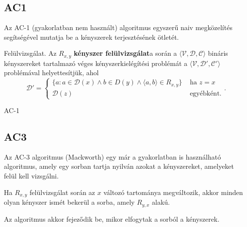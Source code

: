 \subsection{AC1}

Az AC-1 (gyakorlatban nem használt) algoritmus egyszerű naiv megközelítés
segítségével mutatja be a kényszerek terjesztésének ötletét.

\begin{definicio}
    Felülvizsgálat.
    Az $R_{x,y}$ \textbf{kényszer felülvizsgálat}a során a
    $\langle \mathcal{V}, \mathcal{D}, \mathcal{C} \rangle$
    bináris kényszereket tartalmazó véges kényszerkielégítési problémát a
    $\langle \mathcal{V}, \mathcal{D}', \mathcal{C}' \rangle$
    problémával helyettesítjük, ahol \[
    \mathcal{D}' =
    \begin{cases}
        \{a : a \in \mathcal{D}(x) \land b \in D(y) \land \langle a, b\rangle \in R_{x,y}\}
        &\text{ ha } z=x \\
        \mathcal{D}(z)
        &\text{ egyébként.}
    \end{cases}
    .\]
\end{definicio}

\begin{algorithm}[H]
    \DontPrintSemicolon
    {
        \;
    }
    \caption{AC-1}
\end{algorithm}

\subsection{AC3}

Az AC-3 algoritmus (Mackworth) egy már a gyakorlatban is használható
algoritmus, amely egy sorban tartja nyilván azokat a kényszereket, amelyeket
felül kell vizsgálni.

Ha $R_{x,y}$ felülvizsgálat során az  $x$ változó tartománya megváltozik, akkor
minden olyan kényszer ismét bekerül a sorba, amely $R_{y,x}$ alakú.

Az algoritmus akkor fejeződik be, mikor elfogytak a sorból a kényszerek.

